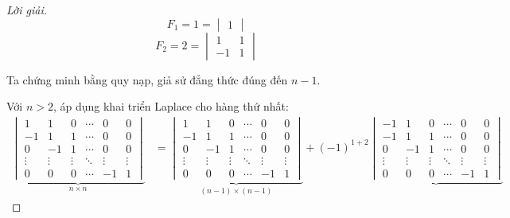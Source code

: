 \documentclass[class=linear-algebra,crop=false]{standalone}
\begin{document}
\begin{proof}[Lời giải]
	\[
		F_{1} = 1 = \begin{vmatrix}1\end{vmatrix}
	\]
	\[
		F_{2} = 2 = \begin{vmatrix}1 & 1 \\ -1 & 1 \end{vmatrix}
	\]
	\par Ta chứng minh bằng quy nạp, giả sử đẳng thức đúng đến $n-1$.
	\par Với $n > 2$, áp dụng khai triển Laplace cho hàng thứ nhất:
	\begingroup{}
	\allowdisplaybreaks{}
	\begin{align*}
		\underbrace{\begin{vmatrix}
				            1      & 1      & 0      & \cdots & 0      & 0      \\
				            -1     & 1      & 1      & \cdots & 0      & 0      \\
				            0      & -1     & 1      & \cdots & 0      & 0      \\
				            \vdots & \vdots & \vdots & \ddots & \vdots & \vdots \\
				            0      & 0      & 0      & \cdots & -1     & 1
			            \end{vmatrix}}_{n\times n}
		 & =
		\underbrace{\begin{vmatrix}
				            1      & 1      & 0      & \cdots & 0      & 0      \\
				            -1     & 1      & 1      & \cdots & 0      & 0      \\
				            0      & -1     & 1      & \cdots & 0      & 0      \\
				            \vdots & \vdots & \vdots & \ddots & \vdots & \vdots \\
				            0      & 0      & 0      & \cdots & -1     & 1
			            \end{vmatrix}}_{(n-1)\times (n-1)}
		+
		{(-1)}^{1+2}
		\underbrace{\begin{vmatrix}
				            -1     & 1      & 0      & \cdots & 0      & 0      \\
				            -1     & 1      & 1      & \cdots & 0      & 0      \\
				            0      & -1     & 1      & \cdots & 0      & 0      \\
				            \vdots & \vdots & \vdots & \ddots & \vdots & \vdots \\
				            0      & 0      & 0      & \cdots & -1     & 1

\end{vmatrix}}
\end{align*}
\end{proof}
\end{document}
